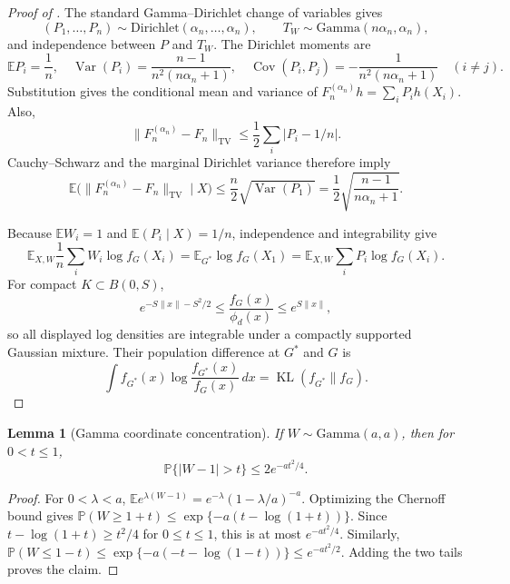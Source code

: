 \documentclass[11pt]{article}
\newtheorem{lemma}[lemma]{Lemma}
\theoremstyle{definition}
\theoremstyle{remark}
\DeclareMathOperator{\KL}{KL}
\DeclareMathOperator{\TV}{TV}
\newcommand{\EE}{\mathbb E}
\newcommand{\PP}{\mathbb P}
\newcommand{\norm}[1]{\lVert #1\rVert}
\newcommand{\abs}[1]{\lvert #1\rvert}
\begin{document}
\begin{proof}[Proof of ]
The standard Gamma--Dirichlet change of variables gives
\[
 (P_1,\ldots,P_n)\sim\mathrm{Dirichlet}(\alpha_n,\ldots,\alpha_n),
 \qquad T_W\sim\mathrm{Gamma}(n\alpha_n,\alpha_n),
\]
and independence between $P$ and $T_W$.  The Dirichlet moments are
\[
 \EE P_i=\frac1n,
 \quad
 \operatorname{Var}(P_i)=\frac{n-1}{n^2(n\alpha_n+1)},
 \quad
 \operatorname{Cov}(P_i,P_j)=-\frac1{n^2(n\alpha_n+1)}\quad(i\ne j).
\]
Substitution gives the conditional mean and variance of
$F_n^{(\alpha_n)}h=\sum_iP_ih(X_i)$.  Also,
\[
 \norm{F_n^{(\alpha_n)}-F_n}_{\TV}
 \le\frac12\sum_i\abs{P_i-1/n}.
\]
Cauchy--Schwarz and the marginal Dirichlet variance therefore imply
\[
 \EE\bigl(\norm{F_n^{(\alpha_n)}-F_n}_{\TV}\mid X\bigr)
 \le\frac n2\sqrt{\operatorname{Var}(P_1)}
 =\frac12\sqrt{\frac{n-1}{n\alpha_n+1}}.
\]

Because $\EE W_i=1$ and $\EE(P_i\mid X)=1/n$, independence and
integrability give
\[
 \EE_{X,W}\frac1n\sum_iW_i\log f_G(X_i)
 =\EE_{G^*}\log f_G(X_1)
 =\EE_{X,W}\sum_iP_i\log f_G(X_i).
\]
For compact $K\subset B(0,S)$,
\[
 e^{-S\norm{x}-S^2/2}
 \le\frac{f_G(x)}{\phi_d(x)}\le e^{S\norm{x}},
\]
so all displayed log densities are integrable under a compactly supported
Gaussian mixture.  Their population difference at $G^*$ and $G$ is
\[
 \int f_{G^*}(x)\log\frac{f_{G^*}(x)}{f_G(x)}\,dx
 =\KL(f_{G^*}\|f_G).
\]
\end{proof}

\begin{lemma}[Gamma coordinate concentration]
\label{lem:gamma-concentration}
If $W\sim\mathrm{Gamma}(a,a)$, then for $0<t\le1$,
\[
 \PP\{\abs{W-1}>t\}\le2e^{-at^2/4}.
\]
\end{lemma}

\begin{proof}
For $0<\lambda<a$,
$\EE e^{\lambda(W-1)}=e^{-\lambda}(1-\lambda/a)^{-a}$.  Optimizing the
Chernoff bound gives
$\PP(W\ge1+t)\le\exp\{-a(t-\log(1+t))\}$.  Since
$t-\log(1+t)\ge t^2/4$ for $0\le t\le1$, this is at most $e^{-at^2/4}$.
Similarly,
$\PP(W\le1-t)\le\exp\{-a(-t-\log(1-t))\}\le e^{-at^2/2}$.
Adding the two tails proves the claim.
\end{proof}
\end{document}
